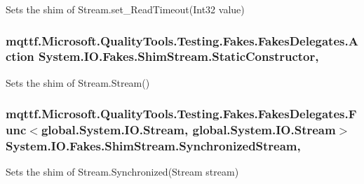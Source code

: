 Sets the shim of Stream.\-set\-\_\-\-Read\-Timeout(\-Int32 value)

\hypertarget{class_system_1_1_i_o_1_1_fakes_1_1_shim_stream_a392efc485c290517b93519d79d4e4845}{
\subsubsection[{Static\-Constructor}]{\setlength{\rightskip}{0pt plus 5cm}mqttf.\-Microsoft.\-Quality\-Tools.\-Testing.\-Fakes.\-Fakes\-Delegates.\-Action System.\-I\-O.\-Fakes.\-Shim\-Stream.\-Static\-Constructor\hspace{0.3cm}{\ttfamily [static]}, {\ttfamily [set]}}}\label{class_system_1_1_i_o_1_1_fakes_1_1_shim_stream_a392efc485c290517b93519d79d4e4845}


Sets the shim of Stream.\-Stream()

\hypertarget{class_system_1_1_i_o_1_1_fakes_1_1_shim_stream_a07a164a37ca7b4ef13e78b9e175367e1}{
\subsubsection[{Synchronized\-Stream}]{\setlength{\rightskip}{0pt plus 5cm}mqttf.\-Microsoft.\-Quality\-Tools.\-Testing.\-Fakes.\-Fakes\-Delegates.\-Func$<$global.\-System.\-I\-O.\-Stream, global.\-System.\-I\-O.\-Stream$>$ System.\-I\-O.\-Fakes.\-Shim\-Stream.\-Synchronized\-Stream\hspace{0.3cm}{\ttfamily [static]}, {\ttfamily [set]}}}\label{class_system_1_1_i_o_1_1_fakes_1_1_shim_stream_a07a164a37ca7b4ef13e78b9e175367e1}


Sets the shim of Stream.\-Synchronized(\-Stream stream)

